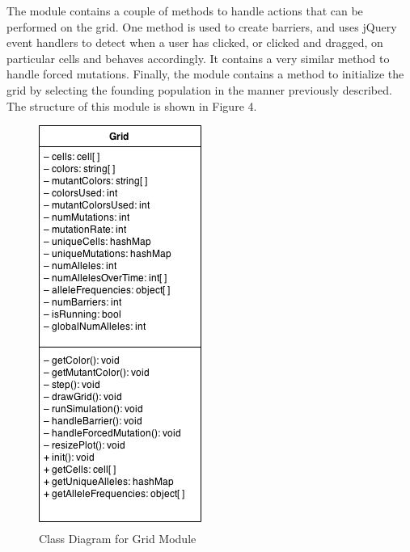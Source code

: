 \documentclass[12pt]{article}
\begin{document}
\begin{spacing}{1.6}
The module contains a couple of methods to handle actions that can be performed on the grid. One method is used to create barriers, and uses jQuery event handlers to detect when a user has clicked, or clicked and dragged, on particular cells and behaves accordingly. It contains a very similar method to handle forced mutations.\newline
\newline
Finally, the module contains a method to initialize the grid by selecting the founding population in the manner previously described. The structure of this module is shown in Figure 4.
\begin{figure}[h]
\caption{Class Diagram for Grid Module}
\centering
\includegraphics[scale=0.5]{grid-class-diagram}
\end{figure}


\end{spacing}
\end{document}
